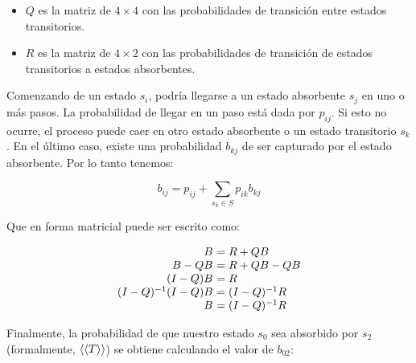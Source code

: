 \begin{itemize}
	\item $Q$ es la matriz de $4 \times 4$ con las probabilidades de transición entre estados transitorios.
	\item $R$ es la matriz de $4 \times 2$ con las probabilidades de transición de estados transitorios a estados absorbentes.
\end{itemize}

Comenzando de un estado $s_i$, podría llegarse a un estado absorbente $s_j$ en uno o más
pasos. La probabilidad de llegar en un paso está dada por $p_{ij}$. Si esto no
ocurre, el proceso puede caer en otro estado absorbente o un estado transitorio
$s_k$. En el último caso, existe una probabilidad $b_{kj}$ de ser capturado por
el estado absorbente. Por lo tanto tenemos:

\begin{equation*}
	b_{ij} = p_{ij} + \sum_{s_k \in S} p_{ik} b_{kj}
\end{equation*}

Que en forma matricial puede ser escrito como:

\[
\begin{array}{r@{\ }l}
	B & = R + QB \\
	B - QB & = R + QB -QB \\
	(I - Q)B & = R \\
	(I - Q)^{-1}(I - Q)B & = (I - Q)^{-1}R \\
	B & = (I - Q)^{-1}R
\end{array}
\]

Finalmente, la probabilidad de que nuestro estado $s_0$ sea absorbido por $s_2$
(formalmente, $\langle\langle T\rangle\rangle$) se obtiene calculando el valor de $b_{02}$:

